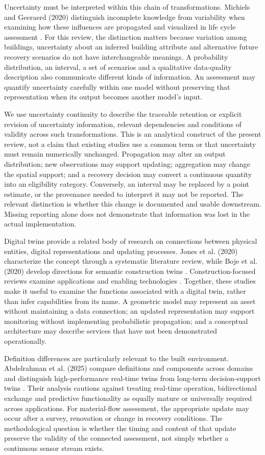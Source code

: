 Uncertainty must be interpreted within this chain of transformations. Michiels and Geeraerd (2020) distinguish incomplete knowledge from variability when examining how these influences are propagated and visualized in life cycle assessment \citep{I25}. For this review, the distinction matters because variation among buildings, uncertainty about an inferred building attribute and alternative future recovery scenarios do not have interchangeable meanings. A probability distribution, an interval, a set of scenarios and a qualitative data-quality description also communicate different kinds of information. An assessment may quantify uncertainty carefully within one model without preserving that representation when its output becomes another model's input.

We use uncertainty continuity to describe the traceable retention or explicit revision of uncertainty information, relevant dependencies and conditions of validity across such transformations. This is an analytical construct of the present review, not a claim that existing studies use a common term or that uncertainty must remain numerically unchanged. Propagation may alter an output distribution; new observations may support updating; aggregation may change the spatial support; and a recovery decision may convert a continuous quantity into an eligibility category. Conversely, an interval may be replaced by a point estimate, or the provenance needed to interpret it may not be reported. The relevant distinction is whether this change is documented and usable downstream. Missing reporting alone does not demonstrate that information was lost in the actual implementation.

Digital twins provide a related body of research on connections between physical entities, digital representations and updating processes. Jones et al. (2020) characterize the concept through a systematic literature review, while Boje et al. (2020) develop directions for semantic construction twins \citep{I27,I26}. Construction-focused reviews examine applications and enabling technologies \citep{I28,I29}. Together, these studies make it useful to examine the functions associated with a digital twin, rather than infer capabilities from its name. A geometric model may represent an asset without maintaining a data connection; an updated representation may support monitoring without implementing probabilistic propagation; and a conceptual architecture may describe services that have not been demonstrated operationally.

Definition differences are particularly relevant to the built environment. Abdelrahman et al. (2025) compare definitions and components across domains and distinguish high-performance real-time twins from long-term decision-support twins \citep{I31}. Their analysis cautions against treating real-time operation, bidirectional exchange and predictive functionality as equally mature or universally required across applications. For material-flow assessment, the appropriate update may occur after a survey, renovation or change in recovery conditions. The methodological question is whether the timing and content of that update preserve the validity of the connected assessment, not simply whether a continuous sensor stream exists.

